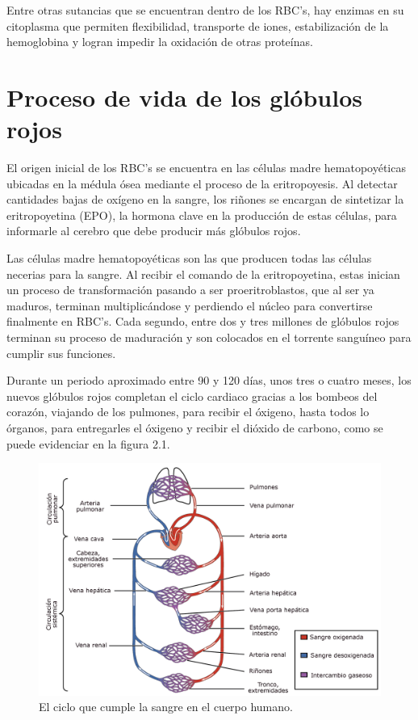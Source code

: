Entre otras sutancias que se encuentran dentro de los RBC's, hay enzimas en su citoplasma que permiten flexibilidad, transporte de iones, estabilización de la hemoglobina y logran impedir la oxidación de otras proteínas.

\section{Proceso de vida de los glóbulos rojos}\label{sec:RBC:vida}

El origen inicial de los RBC's se encuentra en las células madre hematopoyéticas ubicadas en la médula ósea mediante el proceso de la eritropoyesis. Al detectar cantidades bajas de oxígeno en la sangre, los riñones se encargan de sintetizar la eritropoyetina (EPO), la hormona clave en la producción de estas células, para informarle al cerebro que debe producir más glóbulos rojos. 

Las células madre hematopoyéticas son las que producen todas las células necerias para la sangre. Al recibir el comando de la eritropoyetina, estas inician un proceso de transformación pasando a ser proeritroblastos, que al ser ya maduros, terminan multiplicándose y perdiendo el núcleo para convertirse finalmente en RBC's. Cada segundo, entre dos y tres millones de glóbulos rojos terminan su proceso de maduración y son colocados en el torrente sanguíneo para cumplir sus funciones.

Durante un periodo aproximado entre 90 y 120 días, unos tres o cuatro meses, los nuevos glóbulos rojos completan el ciclo cardiaco gracias a los bombeos del corazón, viajando de los pulmones, para recibir el óxigeno, hasta todos lo órganos, para entregarles el óxigeno y recibir el dióxido de carbono, como se puede evidenciar en la figura 2.1.

\begin{figure}[H]
    \centering
    \includegraphics[scale=0.2]{figures/CicloSangre.jpg}
    \caption{El ciclo que cumple la sangre en el cuerpo humano.}
    \label{sec:RBC:fig:CicloSangre}
\end{figure}


